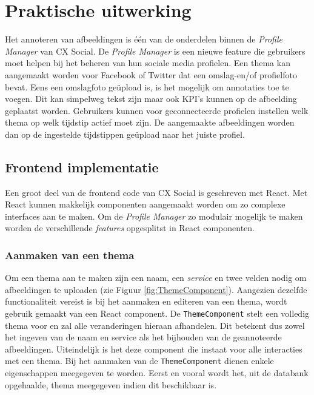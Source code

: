 
\chapter{Praktische uitwerking}
\vspace{-3cm}
Het annoteren van afbeeldingen is \'{e}\'{e}n van de onderdelen binnen de \textit{Profile Manager} van CX Social. De \textit{Profile Manager} is een nieuwe feature die gebruikers moet helpen bij het beheren van hun sociale media profielen. Een thema kan aangemaakt worden voor Facebook of Twitter dat een omslag-en/of profielfoto bevat. Eens een omslagfoto ge\"{u}pload is, is het mogelijk om annotaties toe te voegen. Dit kan simpelweg tekst zijn maar ook KPI's kunnen op de afbeelding geplaatst worden. Gebruikers kunnen voor geconnecteerde profielen instellen welk thema op welk tijdstip actief moet zijn. De aangemaakte afbeeldingen worden dan op de ingestelde tijdstippen ge\"{u}pload naar het juiste profiel. 


\section{Frontend implementatie}
Een groot deel van de frontend code van CX Social is geschreven met React. Met React kunnen makkelijk componenten aangemaakt worden om zo complexe interfaces aan te maken. Om de \textit{Profile Manager} zo modulair mogelijk te maken worden de verschillende \textit{features} opgesplitst in React componenten. 

\subsection{Aanmaken van een thema} \label{AanmakenVanEenThema}

Om een thema aan te maken zijn een naam, een \textit{service} %
en twee velden nodig om afbeeldingen te uploaden (zie Figuur \ref{fig:ThemeComponent}). Aangezien dezelfde functionaliteit vereist is bij het aanmaken en editeren van een thema, wordt gebruik gemaakt van een React component. De \texttt{ThemeComponent} stelt een volledig thema voor en zal alle veranderingen hieraan afhandelen. Dit betekent dus zowel het ingeven van de naam en service als het bijhouden van de geannoteerde afbeeldingen. Uiteindelijk is het deze component die instaat voor alle interacties met een thema. 
Bij het aanmaken van de \texttt{ThemeComponent} dienen enkele eigenschappen meegegeven te worden. Eerst en vooral wordt het, uit de databank opgehaalde, thema meegegeven indien dit beschikbaar is. %

